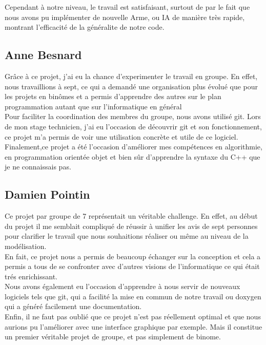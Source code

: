             Cependant à notre niveau, le travail est satisfaisant, surtout de par le fait que nous avons pu implémenter de nouvelle Arme, ou IA de manière très rapide, montrant l'efficacité de la généralite de notre code.
        \subsection{Anne Besnard}
            Grâce à ce projet, j'ai eu la chance d'experimenter le travail en groupe. En effet, nous travaillions à sept, ce qui a demandé une organisation plus évolué que pour les projets en binômes et a permis d'apprendre des autres sur le plan programmation autant que sur l'informatique en général\\

            Pour faciliter la coordination des membres du groupe,  nous avons utilisé git. Lors de mon stage technicien, j'ai eu l'occasion de découvrir git et son fonctionnement, ce projet m'a permis de voir une utilisation concrète et utile de ce logiciel.\\

            Finalement,ce projet a été l'occasion d'améliorer mes compétences en algorithmie, en programmation orientée objet et bien sûr d'apprendre la syntaxe du C++ que je ne connaissais pas. 
		\subsection{Damien Pointin}
			Ce projet par groupe de 7 représentait un véritable challenge. En effet, au début du projet il me semblait compliqué de réussir à unifier les avis de sept personnes pour clarifier le travail que nous souhaitions réaliser ou même au niveau de la modélisation. \\
	
			En fait, ce projet nous a permis de beaucoup échanger sur la conception et cela a permis a tous de se confronter avec d'autres visions de l'informatique ce qui était trés enrichissant. \\

			Nous avons également eu l'occasion d'apprendre à nous servir de nouveaux logiciels tels que git, qui a facilité la mise en commun de notre travail ou doxygen qui a généré facilement une documentation. \\

			Enfin, il ne faut pas oublié que ce projet n'est pas réellement optimal et que nous aurions pu l'améliorer avec une interface graphique par exemple. Mais il constitue un premier véritable projet de groupe, et pas simplement de binome.  
